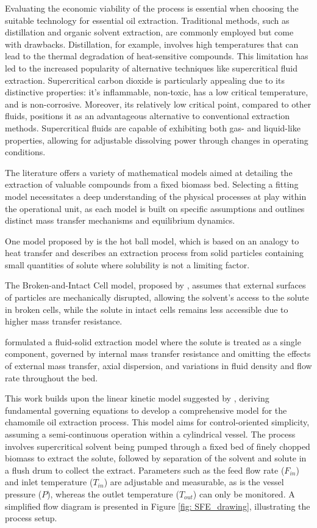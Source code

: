 \documentclass[../Article_Model_Parameters.tex]{subfiles}
\begin{document}
	Evaluating the economic viability of the process is essential when choosing the suitable technology for essential oil extraction. Traditional methods, such as distillation and organic solvent extraction, are commonly employed but come with drawbacks. Distillation, for example, involves high temperatures that can lead to the thermal degradation of heat-sensitive compounds. This limitation has led to the increased popularity of alternative techniques like supercritical fluid extraction. Supercritical carbon dioxide is particularly appealing due to its distinctive properties: it's inflammable, non-toxic, has a low critical temperature, and is non-corrosive. Moreover, its relatively low critical point, compared to other fluids, positions it as an advantageous alternative to conventional extraction methods. Supercritical fluids are capable of exhibiting both gas- and liquid-like properties, allowing for adjustable dissolving power through changes in operating conditions.
	
	The literature offers a variety of mathematical models aimed at detailing the extraction of valuable compounds from a fixed biomass bed. Selecting a fitting model necessitates a deep understanding of the physical processes at play within the operational unit, as each model is built on specific assumptions and outlines distinct mass transfer mechanisms and equilibrium dynamics.
	
	One model proposed by \citet{Reverchon1993} is the hot ball model, which is based on an analogy to heat transfer and describes an extraction process from solid particles containing small quantities of solute where solubility is not a limiting factor.
	
	The Broken-and-Intact Cell model, proposed by \citet{Sovova1994}, assumes that external surfaces of particles are mechanically disrupted, allowing the solvent's access to the solute in broken cells, while the solute in intact cells remains less accessible due to higher mass transfer resistance.
	
	\citet{Reverchon1996} formulated a fluid-solid extraction model where the solute is treated as a single component, governed by internal mass transfer resistance and omitting the effects of external mass transfer, axial dispersion, and variations in fluid density and flow rate throughout the bed.
	
	This work builds upon the linear kinetic model suggested by \citet{Reverchon1996}, deriving fundamental governing equations to develop a comprehensive model for the chamomile oil extraction process. This model aims for control-oriented simplicity, assuming a semi-continuous operation within a cylindrical vessel. The process involves supercritical solvent being pumped through a fixed bed of finely chopped biomass to extract the solute, followed by separation of the solvent and solute in a flush drum to collect the extract. Parameters such as the feed flow rate ($F_{in}$) and inlet temperature ($T_{in}$) are adjustable and measurable, as is the vessel pressure ($P$), whereas the outlet temperature ($T_{out}$) can only be monitored. A simplified flow diagram is presented in Figure \ref{fig: SFE_drawing}, illustrating the process setup.
	
\end{document}
